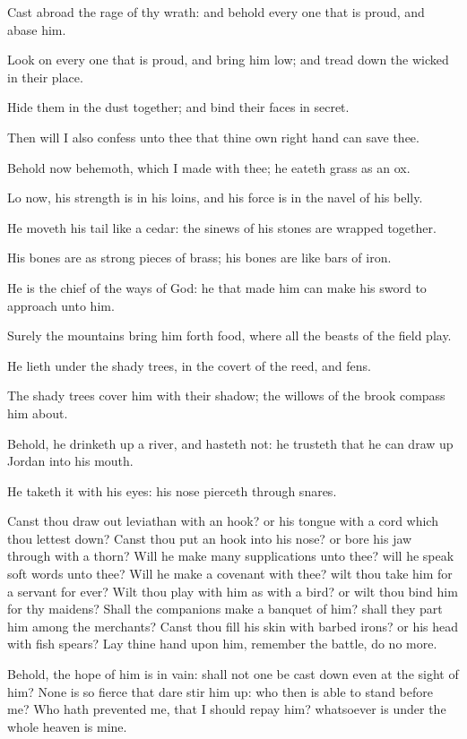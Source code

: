 \Verse Cast abroad the rage of thy wrath: and behold every one that is proud, and abase him.

\Verse Look on every one that is proud, and bring him low; and tread down the wicked in their place.

\Verse Hide them in the dust together; and bind their faces in secret.

\Verse Then will I also confess unto thee that thine own right hand can save thee.

\Verse Behold now behemoth, which I made with thee; he eateth grass as an ox.

\Verse Lo now, his strength is in his loins, and his force is in the navel of his belly.

\Verse He moveth his tail like a cedar: the sinews of his stones are wrapped together.

\Verse His bones are as strong pieces of brass; his bones are like bars of iron.

\Verse He is the chief of the ways of God: he that made him can make his sword to approach unto him.

\Verse Surely the mountains bring him forth food, where all the beasts of the field play.

\Verse He lieth under the shady trees, in the covert of the reed, and fens.

\Verse The shady trees cover him with their shadow; the willows of the brook compass him about.

\Verse Behold, he drinketh up a river, and hasteth not: he trusteth that he can draw up Jordan into his mouth.

\Verse He taketh it with his eyes: his nose pierceth through snares.


\Chapter
\Verse Canst thou draw out leviathan with an hook? or his tongue with a cord which thou lettest down?  \Verse Canst thou put an hook into his nose? or bore his jaw through with a thorn?  \Verse Will he make many supplications unto thee? will he speak soft words unto thee?  \Verse Will he make a covenant with thee? wilt thou take him for a servant for ever?  \Verse Wilt thou play with him as with a bird? or wilt thou bind him for thy maidens?  \Verse Shall the companions make a banquet of him? shall they part him among the merchants?  \Verse Canst thou fill his skin with barbed irons? or his head with fish spears?  \Verse Lay thine hand upon him, remember the battle, do no more.

\Verse Behold, the hope of him is in vain: shall not one be cast down even at the sight of him?  \Verse None is so fierce that dare stir him up: who then is able to stand before me?  \Verse Who hath prevented me, that I should repay him? whatsoever is under the whole heaven is mine.


